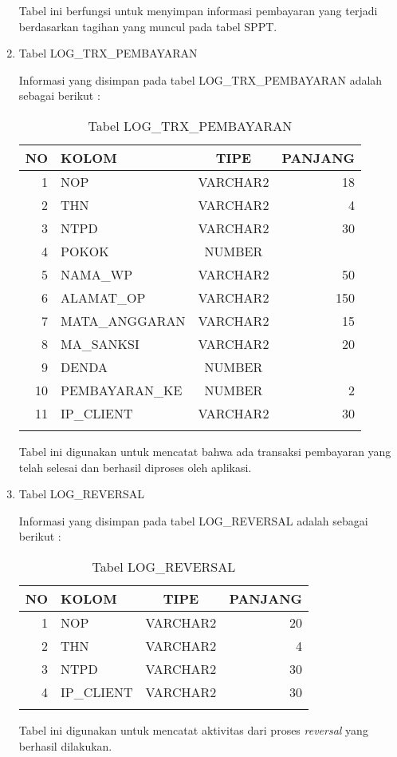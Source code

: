 \begin{enumerate}[1.]
  Tabel ini berfungsi untuk menyimpan informasi pembayaran yang terjadi berdasarkan tagihan yang muncul pada tabel SPPT.
  
  \item Tabel LOG\_TRX\_PEMBAYARAN
  
  Informasi yang disimpan pada tabel LOG\_TRX\_PEMBAYARAN adalah sebagai berikut :
  
  \begin{longtable}{|r|l|c|r|}
    \hline
    \textbf{NO} & \textbf{KOLOM} & \textbf{TIPE} & \textbf{PANJANG} \\
    \hline \hline
    1 & NOP & VARCHAR2 & 18 \\
    \hline
    2 & THN & VARCHAR2 & 4 \\
    \hline
    3 & NTPD & VARCHAR2 & 30 \\
    \hline
    4 & POKOK & NUMBER & \\
    \hline
    5 & NAMA\_WP & VARCHAR2 & 50 \\
    \hline
    6 & ALAMAT\_OP & VARCHAR2 & 150 \\
    \hline
    7 & MATA\_ANGGARAN & VARCHAR2 & 15 \\
    \hline
    8 & MA\_SANKSI & VARCHAR2 & 20 \\
    \hline
    9 & DENDA & NUMBER & \\
    \hline
    10 & PEMBAYARAN\_KE & NUMBER & 2 \\
    \hline
    11 & IP\_CLIENT & VARCHAR2 & 30 \\
    \hline
    \caption{Tabel LOG\_TRX\_PEMBAYARAN}
  \end{longtable}	
  
  Tabel ini digunakan untuk mencatat bahwa ada transaksi pembayaran yang telah selesai dan berhasil diproses oleh aplikasi.
  
  \item Tabel LOG\_REVERSAL
  
  Informasi yang disimpan pada tabel LOG\_REVERSAL adalah sebagai berikut :
  
  \begin{longtable}{|r|l|c|r|}
    \hline
    \textbf{NO} & \textbf{KOLOM} & \textbf{TIPE} & \textbf{PANJANG} \\
    \hline \hline
    1 & NOP & VARCHAR2 & 20 \\
    \hline
    2 & THN & VARCHAR2 & 4 \\
    \hline
    3 & NTPD & VARCHAR2 & 30 \\
    \hline
    4 & IP\_CLIENT & VARCHAR2 & 30 \\
    \hline
    \caption{Tabel LOG\_REVERSAL}
  \end{longtable}
  
  Tabel ini digunakan untuk mencatat aktivitas dari proses \textit{reversal} yang berhasil dilakukan.
\end{enumerate}